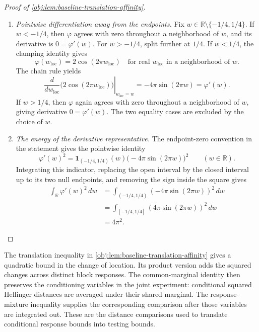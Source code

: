 \documentclass[11pt]{article}
\begin{document}
\begin{proof}[Proof of \cref{obj:lem:baseline-translation-affinity}]
\begin{enumerate}
\item \emph{Pointwise differentiation away from the endpoints.}
Fix \(w\in\mathbb R\setminus\{-1/4,1/4\}\).
If \(w<-1/4\), then \(\varphi\) agrees with zero throughout a neighborhood of \(w\), and its derivative is \(0=\varphi'(w)\).
For \(w>-1/4\), split further at \(1/4\). If \(w<1/4\), the clamping identity gives
\[
\varphi(w_{\mathrm{loc}})=2\cos(2\pi w_{\mathrm{loc}})
\quad\text{for real }w_{\mathrm{loc}}\text{ in a neighborhood of }w.
\]
The chain rule yields
\[
\left.\frac{d}{dw_{\mathrm{loc}}}\bigl(2\cos(2\pi w_{\mathrm{loc}})\bigr)\right|_{w_{\mathrm{loc}}=w}
=-4\pi\sin(2\pi w)=\varphi'(w).
\]
If \(w>1/4\), then \(\varphi\) again agrees with zero throughout a neighborhood of \(w\), giving derivative \(0=\varphi'(w)\). The two equality cases are excluded by the choice of \(w\).

\item \emph{The energy of the derivative representative.}
The endpoint-zero convention in the statement gives the pointwise identity
\[
\varphi'(w)^2
=\mathbf1_{(-1/4,1/4)}(w)
  \bigl(-4\pi\sin(2\pi w)\bigr)^2
\qquad(w\in\mathbb R).
\]
Integrating this indicator, replacing the open interval by the closed interval up to its two null endpoints, and removing the sign inside the square gives
\[
\begin{aligned}
\int_{\mathbb R}\varphi'(w)^2\,dw
&=\int_{(-1/4,1/4)}(-4\pi\sin(2\pi w))^2\,dw\\
&=\int_{[-1/4,1/4]}(4\pi\sin(2\pi w))^2\,dw\\
&=4\pi^2.
\end{aligned}
\]
\end{enumerate}
\end{proof}

The translation inequality in \cref{obj:lem:baseline-translation-affinity} gives a quadratic bound in the change of location. Its product version adds the squared changes across distinct block responses. The common-marginal identity then preserves the conditioning variables in the joint experiment: conditional squared Hellinger distances are averaged under their shared marginal. The response-mixture inequality supplies the corresponding comparison after those variables are integrated out. These are the distance comparisons used to translate conditional response bounds into testing bounds.
\end{document}
